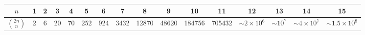 \begin{center}
\begin{tabular}{c|c@{\ }c@{\ }c@{\ }c@{\ }c@{\ }c@{\ }c@{\ }c@{\ }c@{\ }c@{\ }c@{\ }c@{\ }c@{\ }c@{\ }c}
$n$             & 1 & 2 & 3  & 4  & 5   & 6   & 7    & 8     & 9     & 10     & 11     & 12      & 13       & 14       & 15\\
\hline
  $\binom{2n}{n}$ & 2 & 6 & 20 & 70 & 252 & 924 & 3432 & 12870 & 48620 & 184756 & 705432 & $\sim2\times10^6$ & $\sim10^7$ & $\sim4\times10^7$ & $\sim1.5\times10^8$ \\
\end{tabular}\\
\end{center}

